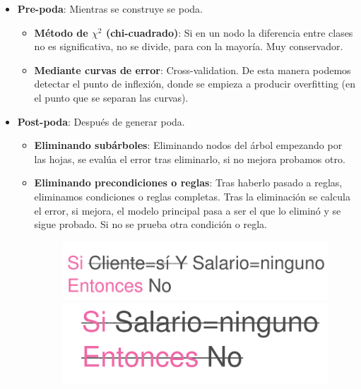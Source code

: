 \documentclass[12pt, twoside, openright]{report} %
\begin{document}
\begin{itemize}
\item
  \textbf{Pre-poda}: Mientras se construye se poda.

  \begin{itemize}
  
  \item
    \textbf{Método de \(\chi^2\) (chi-cuadrado)}: Si en un nodo la
    diferencia entre clases no es significativa, no se divide, para con
    la mayoría. Muy conservador.
  \item
    \textbf{Mediante curvas de error}: Cross-validation. De esta manera
    podemos detectar el punto de inflexión, donde se empieza a producir
    overfitting (en el punto que se separan las curvas).
  \end{itemize}
\item
  \textbf{Post-poda}: Después de generar poda.

  \begin{itemize}
  \item
    \textbf{Eliminando subárboles}: Eliminando nodos del árbol empezando
    por las hojas, se evalúa el error tras eliminarlo, si no mejora
    probamos otro.
  \pagebreak
  \item
    \textbf{Eliminando precondiciones o reglas}: Tras haberlo pasado a
    reglas, eliminamos condiciones o reglas completas. Tras la
    eliminación se calcula el error, si mejora, el modelo principal pasa
    a ser el que lo eliminó y se sigue probado. Si no se prueba otra
    condición o regla.
	\begin{figure}[H]
		{\includegraphics[scale=.2]{image-20210305201114245.png}
		\includegraphics[scale=.2]{image-20210305201127523.png}}
	\end{figure}
  \end{itemize}
\end{itemize}
\end{document}
